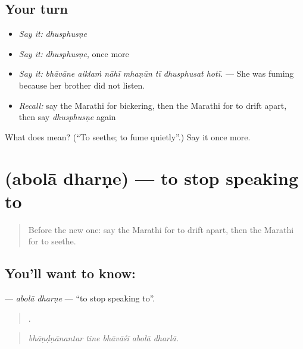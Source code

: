 \subsection*{Your turn}
\begin{itemize}
\raggedright
  \item \emph{Say it:} \emph{dhusphusṇe}
  \item \emph{Say it:} \emph{dhusphusṇe}, once more
  \item \emph{Say it:} \emph{bhāvāne aiklaṁ nāhī mhaṇūn tī dhusphusat hotī.} — She was fuming because her brother did not listen.
  \item \emph{Recall:} say the Marathi for bickering, then the Marathi for to drift apart, then say \emph{dhusphusṇe} again
\end{itemize}

\begin{tcolorbox}[breakable,colback=teal!4,colframe=teal!35!black,title={Before you move on}]
What does  mean? (\textquotedblleft{}To seethe; to fume quietly\textquotedblright{}.) Say it once more.
\end{tcolorbox}
\section[\texorpdfstring{\mr{अबोला} \mr{धरणे} (abolā dharṇe)}{अबोला धरणे (abolā dharṇe)}]{  (abolā dharṇe) — to stop speaking to}

\label{lesson:MR-C502-abola-dharne}



\begin{quote}
Before the new one: say the Marathi for to drift apart, then the Marathi for to seethe.
\end{quote}

\subsection*{You'll want to know:  }
\textbf{ } — \emph{abolā dharṇe} — \textquotedblleft{}to stop speaking to\textquotedblright{}.

\begin{quote}
    .
\end{quote}

\begin{quote}
\emph{bhāṇḍṇānantar tine bhāvāśī abolā dharlā.}
\end{quote}

